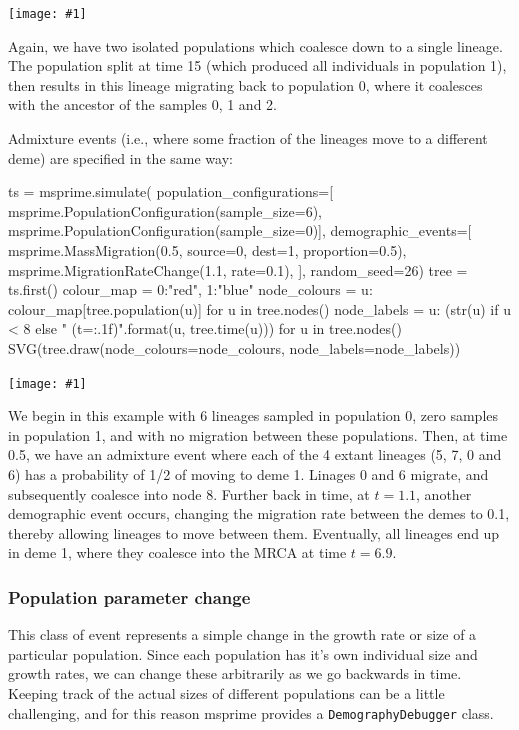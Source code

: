 \documentclass[graybox]{svmult}
\newcommand{\includenbimage}[1]{\begin{center}\texttt{[image: \#1]}\end{center}}
\begin{document}
\includenbimage{images/simulations_37_0.pdf}

Again, we have two isolated populations which coalesce down to a single
lineage. The population split at time 15 (which produced all individuals
in population 1), then results in this lineage migrating back to
population 0, where it coalesces with the ancestor of the samples 0, 1
and 2.

Admixture events (i.e., where some fraction of the lineages move to a
different deme) are specified in the same way:

\begin{pythoncode}
ts  = msprime.simulate(
    population_configurations=[
        msprime.PopulationConfiguration(sample_size=6),
        msprime.PopulationConfiguration(sample_size=0)],
    demographic_events=[
        msprime.MassMigration(0.5, source=0, dest=1, proportion=0.5),
        msprime.MigrationRateChange(1.1, rate=0.1),
    ],
    random_seed=26)
tree = ts.first()
colour_map = {0:"red", 1:"blue"}
node_colours = {u: colour_map[tree.population(u)] for u in tree.nodes()}
node_labels = {
    u: (str(u) if u < 8 else "{} (t={:.1f})".format(u, tree.time(u)))
    for u in tree.nodes()}
SVG(tree.draw(node_colours=node_colours, node_labels=node_labels))
\end{pythoncode}

\includenbimage{images/simulations_39_0.pdf}

    We begin in this example with 6 lineages sampled in population 0, zero
samples in population 1, and with no migration between these
populations. Then, at time 0.5, we have an admixture event where each of
the 4 extant lineages (5, 7, 0 and 6) has a probability of 1/2 of moving
to deme 1. Linages 0 and 6 migrate, and subsequently coalesce into node
8. Further back in time, at \(t=1.1\), another demographic event occurs,
changing the migration rate between the demes to 0.1, thereby allowing
lineages to move between them. Eventually, all lineages end up in deme
1, where they coalesce into the MRCA at time \(t=6.9\).

\subsubsection{Population parameter change}\label{population-parameter-change}

This class of event represents a simple change in the growth rate or
size of a particular population. Since each population has it's own
individual size and growth rates, we can change these arbitrarily as we
go backwards in time. Keeping track of the actual sizes of different
populations can be a little challenging, and for this reason msprime
provides a \texttt{DemographyDebugger} class.
\end{document}
